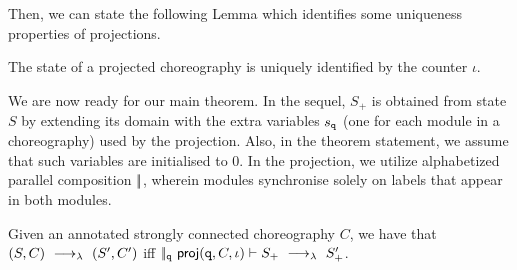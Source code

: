 Then, we can state the following Lemma which identifies some
uniqueness properties of projections. 
\begin{lemma}
  The state of a projected choreography is uniquely identified by the
  counter $\iota$.
\end{lemma}

We are now ready for our main theorem. In the sequel, $S_+$ is
obtained from state $S$ by extending its domain with the extra
variables $s_{\mathtt{q}}$ (one for each module in a choreography) used
by the projection. Also, in the theorem statement, we assume that such
variables are initialised to $0$. In the projection, we utilize
alphabetized parallel composition $|\!|$, wherein modules synchronise
solely on labels that appear in both modules.
%
\begin{theorem}[Projection]\label{thm:epp}
  Given an annotated strongly connected choreography $C$, we have that
  $(S,C) \ \longrightarrow_{\lambda}\  (S', C')$ iff
  $|\!|_{\mathtt{q}}\ \mathsf{proj} (\mathtt{q}, C,\iota)\vdash S_{+} \ \longrightarrow_{\lambda}\ 
  S_{+}'$.
\end{theorem}
